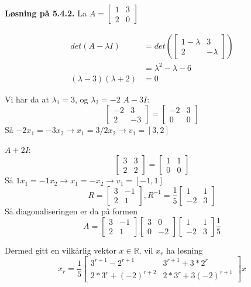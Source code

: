 \documentclass[a4paper,norsk]{article}
\newenvironment{oppgave}[1]%
	{\trivlist{}\item\relax\textbf{Løsning på #1.}\medspace}%
	{\endtrivlist}
\begin{document}
\begin{oppgave}{5.4.2}
La $ A = \begin{bmatrix}
    1&3\\
    2&0
\end{bmatrix}  $ 

\begin{align*}
    det(A-\lambda I) &= det \left(  \begin{bmatrix}
        1-\lambda& 3 \\
        2 &-\lambda
    \end{bmatrix}  \right) \\
    &= \lambda^2 - \lambda - 6 \\
    \left( \lambda -3 \right) \left( \lambda +2 \right) &=0
\end{align*}

Vi har da at $ \lambda_1 = 3 $, og $ \lambda_2 =-2 $  
$ A-3I: $
\[
    \begin{bmatrix}
        -2&3\\
        2&-3
    \end{bmatrix} = \begin{bmatrix}
        -2& 3\\
        0&0
    \end{bmatrix} 
\]
Så $ -2x_1 = -3x_2 \rightarrow x_1 = 3/2 x_2 \rightarrow v_1 = \left[ 3, 2 \right] $  

 
$ A+2I: $
\[
    \begin{bmatrix}
        3&3\\
        2&2
    \end{bmatrix} = \begin{bmatrix}
        1& 1\\
        0&0
    \end{bmatrix} 
\]
Så $ 1x_1 = -1x_2 \rightarrow x_1 = -x_2 \rightarrow v_1 = \left[ -1, 1 \right] $  
\[
    R = \begin{bmatrix}
        3&-1\\
        2&1
    \end{bmatrix}, R^{-1} = \frac{ 1 }{ 5 } \begin{bmatrix}
        1&1\\
        -2&3
    \end{bmatrix} 
\]
Så diagonaliseringen er da på formen
\[
    A = \begin{bmatrix}
        3&-1\\
        2&1
    \end{bmatrix} \begin{bmatrix}
        3&0\\
        0&-2
    \end{bmatrix} \begin{bmatrix}
        1&1\\
        -2&3
    \end{bmatrix} \frac{ 1 }{ 5 }
\]

Dermed gitt en vilkårlig vektor $ x \in \mathbb{R} $, vil $ x_r $  ha løsning 
\[
    x_r = \frac{ 1 }{ 5 } \begin{bmatrix}
        3^{r+1}-2^{r+1} & 3^{r+1} + 3*2^r\\
        2*3^r+(-2)^{r+2} & 2*3^r + 3 (-2)^{r+1}
    \end{bmatrix} x
\]

 
 



\end{oppgave}
\end{document}
